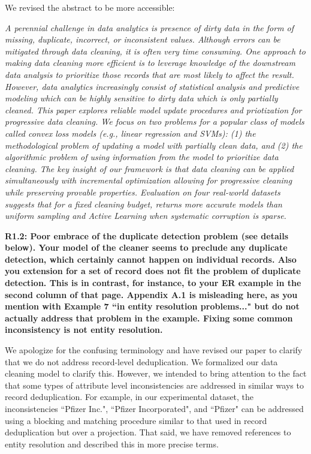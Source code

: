 We revised the abstract to be more accessible:

\emph{A perennial challenge in data analytics is presence of dirty data in the form of missing, duplicate, incorrect, or inconsistent values.
Although errors can be mitigated through data cleaning, it is often very time consuming.
One approach to making data cleaning more efficient is to leverage knowledge of the downstream data analysis to prioritize those records that are most likely to affect the result.
However, data analytics increasingly consist of statistical analysis and predictive modeling which can be highly sensitive to dirty data which is only partially cleaned.
This paper explores reliable model update procedures and priotization for progressive data cleaning.
We focus on two problems for a popular class of models called convex loss models (e.g., linear regression and SVMs): (1) the methodological problem of updating a model with partially clean data, and (2) the algorithmic problem of using information from the model to prioritize data cleaning.
The key insight of our framework is that data cleaning can be applied simultaneously with incremental optimization allowing for progressive cleaning while preserving provable properties.
Evaluation on four real-world datasets suggests that for a fixed cleaning budget, \sys returns more accurate models than uniform sampling and Active Learning when systematic corruption is sparse. }

\vspace{0.5em}

\noindent\textbf{R1.2: Poor embrace of the duplicate detection problem (see details below). Your model of the cleaner seems to preclude any duplicate detection, which certainly cannot happen on individual records. Also you extension for a set of record does not fit the problem of duplicate detection. This is in contrast, for instance, to your ER example in the second column of that page. Appendix A.1 is misleading here, as you mention with Example 7 ``in entity resolution problems..." but do not actually address that problem in the example. Fixing some common inconsistency is not entity resolution.}

We apologize for the confusing terminology and have revised our paper to clarify that we do not address record-level deduplication.
We formalized our data cleaning model to clarify this.
However, we intended to bring attention to the fact that some types of attribute level inconsistencies are addressed in similar ways to record deduplication.
For example, in our experimental dataset, the inconsistencies ``Pfizer Inc.", ``Pfizer Incorporated", and ``Pfizer" can be addressed using a blocking and matching procedure similar to that used in record deduplication but over a projection.
That said, we have removed references to entity resolution and described this in more precise terms.

